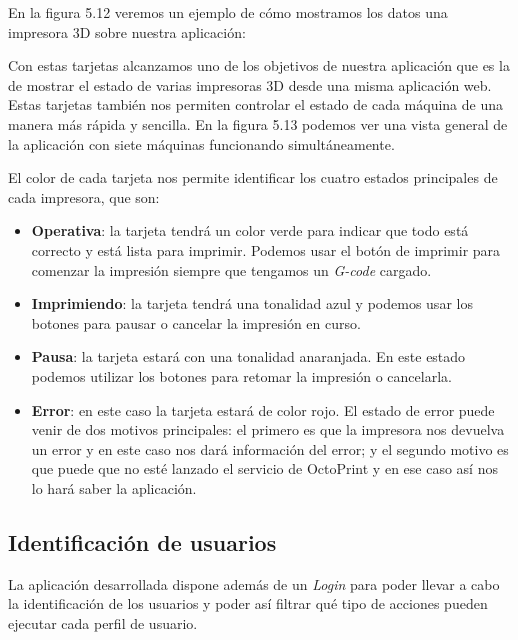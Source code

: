 En la figura 5.12 veremos un ejemplo de cómo mostramos los datos una 
impresora 3D sobre nuestra aplicación:


Con estas tarjetas alcanzamos uno de los objetivos de nuestra aplicación que es la  de mostrar el estado de varias impresoras 3D desde una misma aplicación web. Estas tarjetas también nos permiten controlar el estado de cada máquina de una manera más rápida y sencilla. En la figura 5.13 podemos ver una vista general de la aplicación con siete máquinas funcionando simultáneamente.


El color de cada tarjeta nos permite identificar los cuatro estados principales de cada impresora, que son:

\begin{itemize}
\item \textbf{Operativa}: la tarjeta tendrá un color verde para indicar que todo está correcto y está lista para imprimir. Podemos usar el botón de imprimir para comenzar la impresión siempre que tengamos un \textit{G-code} cargado.

\item \textbf{Imprimiendo}: la tarjeta tendrá una tonalidad azul y podemos usar los botones para pausar o cancelar la impresión en curso.

\item \textbf{Pausa}: la tarjeta estará con una tonalidad anaranjada. En este estado podemos utilizar los botones para retomar la impresión o cancelarla.

\item \textbf{Error}: en este caso la tarjeta estará de color rojo. El estado de error puede venir de dos motivos principales: el primero es que la impresora nos devuelva un error y en este caso nos dará información del error; y el segundo motivo es que puede que no esté lanzado el servicio de OctoPrint y en ese caso así nos lo hará saber la aplicación.
\end{itemize}

\subsection{Identificación de usuarios}

La aplicación desarrollada dispone además de un \textit{Login} para poder llevar a cabo la identificación de los usuarios y poder así filtrar qué tipo de acciones pueden ejecutar cada perfil de usuario. 

